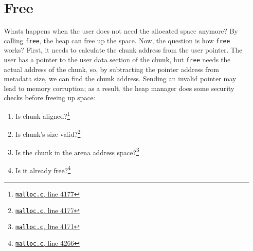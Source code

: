 \documentclass{masterthesis}
\begin{document}
\section{Free}
Whats happens when the user does not need the allocated space anymore? By calling \lstinline{free}, the heap can free up the space. Now, the question is how \lstinline{free} works? First, it needs to calculate the chunk address from the user pointer. The user has a pointer to the user data section of the chunk, but \lstinline{free} needs the actual address of the chunk, so, by subtracting the pointer address from metadata size, we can find the chunk address. Sending an invalid pointer may lead to memory corruption; as a result, the heap manager does some security checks before freeing up space:

\begin{enumerate}
	\item Is chunk aligned?\footnote{\href{https://sourceware.org/git/?p=glibc.git;a=blob;f=malloc/malloc.c;h=f7cd29bc2f93e1082ee77800bd64a4b2a2897055;hb=9ea3686266dca3f004ba874745a4087a89682617\#l4177}{\texttt{malloc.c}, line 4177}}
	\item Is chunk's size valid?\footnote{\href{https://sourceware.org/git/?p=glibc.git;a=blob;f=malloc/malloc.c;h=f7cd29bc2f93e1082ee77800bd64a4b2a2897055;hb=9ea3686266dca3f004ba874745a4087a89682617\#l4177}{\texttt{malloc.c}, line 4177}}
	\item Is the chunk in the arena address space?\footnote{\href{https://sourceware.org/git/?p=glibc.git;a=blob;f=malloc/malloc.c;h=f7cd29bc2f93e1082ee77800bd64a4b2a2897055;hb=9ea3686266dca3f004ba874745a4087a89682617\#l4177}{\texttt{malloc.c}, line 4171}}
	\item Is it already free?\footnote{\href{https://sourceware.org/git/?p=glibc.git;a=blob;f=malloc/malloc.c;h=f7cd29bc2f93e1082ee77800bd64a4b2a2897055;hb=9ea3686266dca3f004ba874745a4087a89682617\#l4177}{\texttt{malloc.c}, line 4266}}
\end{enumerate}
\end{document}
